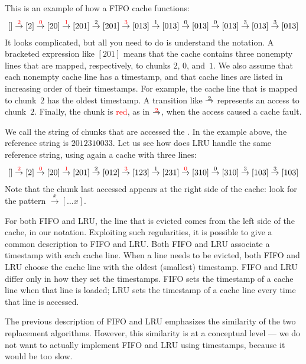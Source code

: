 This is an example of how a FIFO cache functions:
\begin{align*}
\def\f#1{{\color{red}#1}}
\def\t#1{\overset{#1}{\to}}
[] \t{\f2} [2] \t{\f0} [20] \t{\f1} [201] \t{2} [201] \t{\f3} [013] \t{1} [013]
  \t{0} [013] \t{0} [013] \t{3} [013] \t{3} [013]
\end{align*}
It looks complicated, but all you need to do is understand the notation.
A bracketed expression like $[201]$ means that
  the cache contains three nonempty lines that are mapped, respectively,
  to chunks $2$, $0$, and~$1$.
We also assume that each nonempty cache line has a timestamp,
  and that cache lines are listed in increasing order of their timestamps.
For example, the cache line that is mapped to chunk~$2$ has the oldest timestamp.
A transition like $\overset{\vbox to 0pt{\vss\hbox{$\scriptstyle2$}\vskip-2pt}}{\to}$ represents an access to chunk~$2$.
Finally, the chunk is \textcolor{red}{red},
  as in $\overset{\vbox to 0pt{\vss\hbox{$\scriptstyle\color{red}2$}\vskip-2pt}}{\to}$,
  when the access caused a cache fault.

We call the string of chunks that are accessed the .
In the example above, the reference string is $2012310033$.
Let us see how does LRU handle the same reference string,
  using again a cache with three lines:
\begin{align*}
\def\f#1{{\color{red}#1}}
\def\t#1{\overset{#1}{\to}}
[] \t{\f2} [2] \t{\f0} [20] \t{\f1} [201] \t{2} [012] \t{\f3} [123] \t{1} [231]
  \t{\f0} [310] \t{0} [310] \t{3} [103] \t{3} [103]
\end{align*}
Note that the chunk last accessed appears at the right side of the cache:
  look for the pattern $\overset{x}{\to}[\dots x]$.

For both FIFO and LRU,
  the line that is evicted comes from the left side of the cache,
  in our notation.
Exploiting such regularities,
  it is possible to give a common description to FIFO and LRU\null.
Both FIFO and LRU associate a timestamp with each cache line.
When a line needs to be evicted,
  both FIFO and LRU choose the cache line with the oldest (smallest) timestamp.
FIFO and LRU differ only in how they set the timestamps.
FIFO sets the timestamp of a cache line when that line is loaded;
LRU sets the timestamp of a cache line every time that line is accessed.

The previous description of FIFO and LRU
  emphasizes the similarity of the two replacement algorithms.
However, this similarity is at a conceptual level ---
  we do not want to actually implement FIFO and LRU using timestamps,
  because it would be too slow.


